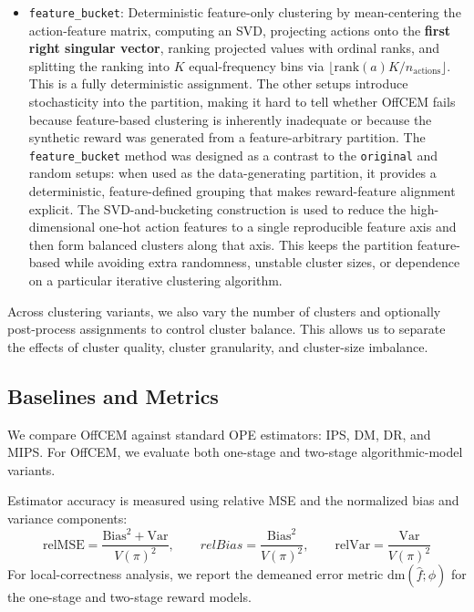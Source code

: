 \documentclass[11pt]{article}
\newcommand{\IPS}{\textsc{IPS}}
\newcommand{\MIPS}{\textsc{MIPS}}
\newcommand{\DM}{\textsc{DM}}
\newcommand{\DR}{\textsc{DR}}
\newcommand{\relMSE}{\mathrm{relMSE}}
\newcommand{\relVar}{\mathrm{relVar}}
\newcommand{\dm}{\mathrm{dm}}
\begin{document}
\begin{itemize}
  \item \texttt{feature\_bucket}: Deterministic feature-only clustering by mean-centering the action-feature matrix, computing an SVD, projecting actions onto the \textbf{first right singular vector}, ranking projected values with ordinal ranks, and splitting the ranking into $K$ equal-frequency bins via  $\lfloor \mathrm{rank}(a)K/n_{\mathrm{actions}}\rfloor$. This is a fully deterministic assignment.  The other setups introduce stochasticity into the partition, making it hard to tell whether OffCEM fails because feature-based clustering is inherently inadequate or because the synthetic reward was generated from a feature-arbitrary partition. The \texttt{feature\_bucket} method was designed as a contrast to the \texttt{original} and random setups: when used as the data-generating partition, it provides a deterministic, feature-defined grouping that makes reward-feature alignment explicit. The SVD-and-bucketing construction is used to reduce the high-dimensional one-hot action features to a single reproducible feature axis and then form balanced clusters along that axis. This keeps the partition feature-based while avoiding extra randomness, unstable
  cluster sizes, or dependence on a particular iterative clustering algorithm.

\end{itemize}

Across clustering variants, we also vary the number of clusters and optionally post-process assignments to control cluster balance. This allows us to separate the effects of cluster quality, cluster granularity, and cluster-size imbalance.

\subsection{Baselines and Metrics}

We compare OffCEM against standard OPE estimators: \IPS{}, \DM{}, \DR{}, and \MIPS{}. For OffCEM, we evaluate both one-stage and two-stage algorithmic-model variants.

Estimator accuracy is measured using relative MSE and the normalized bias and variance components:
$$ \relMSE = \frac{\mathrm{Bias}^2+\mathrm{Var}}{V(\pi)^2}, \qquad relBias = \frac{\mathrm{Bias}^2}{V(\pi)^2}, \qquad \relVar= \frac{\mathrm{Var}}{V(\pi)^2}$$
For local-correctness analysis, we report the demeaned error metric $\dm(\hat f;\phi)$ for the one-stage and two-stage reward models.
\end{document}
